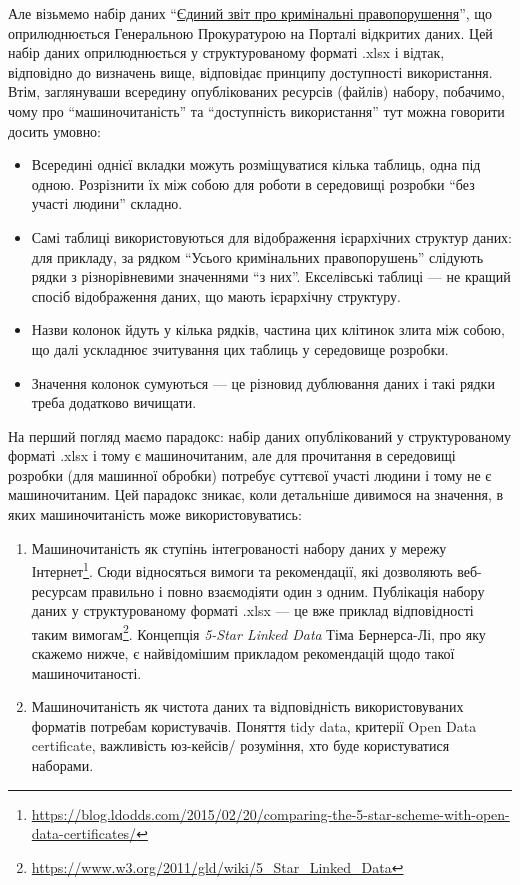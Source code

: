 \documentclass[
]{agujournal2019}
\providecommand{\tightlist}{%
  \setlength{\itemsep}{0pt}\setlength{\parskip}{0pt}}\usepackage{longtable,booktabs,array}
\begin{document}
Але візьмемо набір даних
``\href{https://data.gov.ua/dataset/8b9b1677-2407-454a-bfa7-76eb638c0ea1}{Єдиний
звіт про кримінальні правопорушення}'', що оприлюднюється Генеральною
Прокуратурою на Порталі відкритих даних. Цей набір даних оприлюднюється
у структурованому форматі .xlsx і відтак, відповідно до визначень вище,
відповідає принципу доступності використання. Втім, заглянуваши
всередину опублікованих ресурсів (файлів) набору, побачимо, чому про
``машиночитаність'' та ``доступність використання'' тут можна говорити
досить умовно:

\begin{itemize}
\tightlist
\item
  Всередині однієї вкладки можуть розміщуватися кілька таблиць, одна під
  одною. Розрізнити їх між собою для роботи в середовищі розробки ``без
  участі людини'' складно.
\item
  Самі таблиці використовуються для відображення ієрархічних структур
  даних: для прикладу, за рядком ``Усього кримінальних правопорушень''
  слідують рядки з різнорівневими значеннями ``з них''. Екселівські
  таблиці --- не кращий спосіб відображення даних, що мають ієрархічну
  структуру.
\item
  Назви колонок йдуть у кілька рядків, частина цих клітинок злита між
  собою, що далі ускладнює зчитування цих таблиць у середовище розробки.
\item
  Значення колонок сумуються --- це різновид дублювання даних і такі
  рядки треба додатково вичищати.
\end{itemize}

На перший погляд маємо парадокс: набір даних опублікований у
структурованому форматі .xlsx і тому є машиночитаним, але для прочитання
в середовищі розробки (для машинної обробки) потребує суттєвої участі
людини і тому не є машиночитаним. Цей парадокс зникає, коли детальніше
дивимося на значення, в яких машиночитаність може використовуватись:

\begin{enumerate}
\def\labelenumi{\arabic{enumi}.}
\tightlist
\item
  Машиночитаність як ступінь інтегрованості набору даних у мережу
  Інтернет\footnote{\url{https://blog.ldodds.com/2015/02/20/comparing-the-5-star-scheme-with-open-data-certificates/}}.
  Сюди відносяться вимоги та рекомендації, які дозволяють веб-ресурсам
  правильно і повно взаємодіяти один з одним. Публікація набору даних у
  структурованому форматі .xlsx --- це вже приклад відповідності таким
  вимогам\footnote{\url{https://www.w3.org/2011/gld/wiki/5_Star_Linked_Data}}.
  Концепція \emph{5-Star Linked Data} Тіма Бернерса-Лі, про яку скажемо
  нижче, є найвідомішим прикладом рекомендацій щодо такої
  машиночитаності.
\item
  Машиночитаність як чистота даних та відповідність використовуваних
  форматів потребам користувачів. Поняття tidy data, критерії Open Data
  certificate, важливість юз-кейсів/ розуміння, хто буде користуватися
  наборами.
\end{enumerate}
\end{document}
